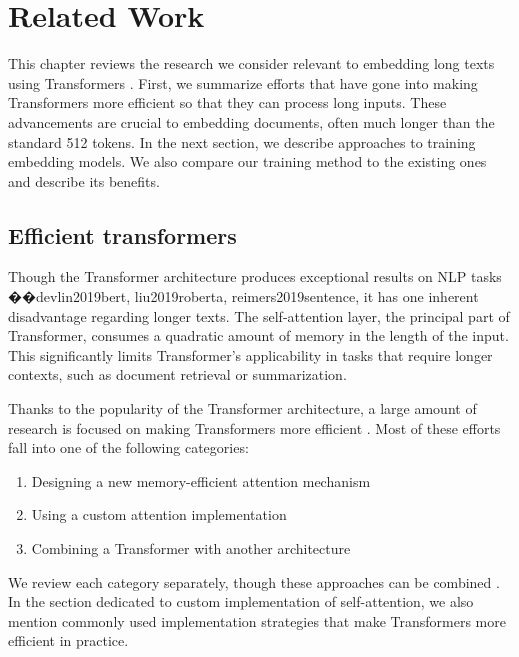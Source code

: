 \chapter{Related Work}\label{chapter:related_work}

This chapter reviews the research we consider relevant to embedding
long texts using Transformers \citep{vaswani2017attention}. First, we summarize
efforts that have gone into making Transformers more efficient so that they
can process long inputs. These advancements are crucial to embedding documents,
often much longer than the standard 512 tokens. In the next section, we
describe approaches to training embedding models. We also compare our training method to the existing ones and describe its benefits.

\section{Efficient transformers}\label{section:efficient_transformers}

Though the Transformer architecture produces exceptional results on NLP tasks ��devlin2019bert, liu2019roberta, reimers2019sentence, it has one
inherent disadvantage regarding longer texts. The self-attention layer, the
principal part of Transformer, consumes a quadratic amount of memory in the
length of the input. This significantly limits Transformer's applicability
in tasks that require longer contexts, such as document retrieval or
summarization.

Thanks to the popularity of the Transformer architecture, a large
amount of research is focused on making Transformers more
efficient \citep{tay2022efficient}. Most of these efforts fall into one of the
following categories:

\begin{enumerate}

    \item Designing a new memory-efficient attention mechanism

    \item Using a custom attention implementation

    \item Combining a Transformer with another architecture

\end{enumerate}

We review each category separately, though these approaches can be
combined \citep{child2019generating,beltagy2020longformer}. In the section
dedicated to custom implementation of self-attention, we also mention commonly
used implementation strategies that make Transformers more efficient in
practice.

